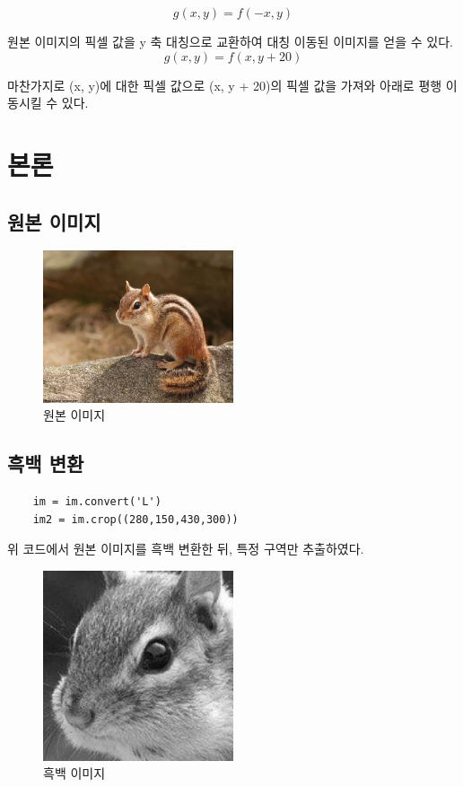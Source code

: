 \documentclass[]{report}
\begin{document}
\[ g(x, y) = f(-x, y)\]

원본 이미지의 픽셀 값을 y 축 대칭으로 교환하여 대칭 이동된 이미지를 얻을 수 있다.\\

\[ g(x, y) = f(x, y + 20)\]

마찬가지로 (x, y)에 대한 픽셀 값으로 (x, y + 20)의 픽셀 값을 가져와 아래로 평행 이동시킬 수 있다.\\ 

\section{본론}

\subsection{원본 이미지}

\begin{figure}[ht!]
	\centering
	\includegraphics[width=0.5\textwidth]{chipmunk.png}
	\caption{원본 이미지}
\end{figure}

\subsection{흑백 변환}

\begin{lstlisting}
	im = im.convert('L')
	im2 = im.crop((280,150,430,300))
\end{lstlisting}

위 코드에서 원본 이미지를 흑백 변환한 뒤, 특정 구역만 추출하였다.\\

\begin{figure}[ht!]
	\centering
	\includegraphics[width=0.5\textwidth]{chipmunk_head.png}
	\caption{흑백 이미지}
\end{figure}
\end{document}
